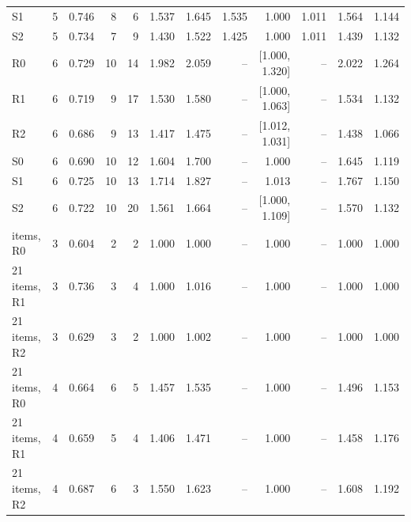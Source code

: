 \begin{table}[h]
\begin{tabular}{llrrrrrrrrrr}
S1 & 5 & 0.746 & 8 & 6 & 1.537 & 1.645 & 1.535 & 1.000 & 1.011 & 1.564 & 1.144 \\
S2 & 5 & 0.734 & 7 & 9 & 1.430 & 1.522 & 1.425 & 1.000 & 1.011 & 1.439 & 1.132 \\
R0 & 6 & 0.729 & 10 & 14 & 1.982 & 2.059 & -- & [1.000, 1.320] & -- & 2.022 & 1.264 \\
R1 & 6 & 0.719 & 9 & 17 & 1.530 & 1.580 & -- & [1.000, 1.063] & -- & 1.534 & 1.132 \\
R2 & 6 & 0.686 & 9 & 13 & 1.417 & 1.475 & -- & [1.012, 1.031] & -- & 1.438 & 1.066 \\
S0 & 6 & 0.690 & 10 & 12 & 1.604 & 1.700 & -- & 1.000 & -- & 1.645 & 1.119 \\
S1 & 6 & 0.725 & 10 & 13 & 1.714 & 1.827 & -- & 1.013 & -- & 1.767 & 1.150 \\
S2 & 6 & 0.722 & 10 & 20 & 1.561 & 1.664 & -- & [1.000, 1.109] & -- & 1.570 & 1.132 \\
\addlinespace[2pt]
21 items, R0 & 3 & 0.604 & 2 & 2 & 1.000 & 1.000 & -- & 1.000 & -- & 1.000 & 1.000 \\
21 items, R1 & 3 & 0.736 & 3 & 4 & 1.000 & 1.016 & -- & 1.000 & -- & 1.000 & 1.000 \\
21 items, R2 & 3 & 0.629 & 3 & 2 & 1.000 & 1.002 & -- & 1.000 & -- & 1.000 & 1.000 \\
21 items, R0 & 4 & 0.664 & 6 & 5 & 1.457 & 1.535 & -- & 1.000 & -- & 1.496 & 1.153 \\
21 items, R1 & 4 & 0.659 & 5 & 4 & 1.406 & 1.471 & -- & 1.000 & -- & 1.458 & 1.176 \\
21 items, R2 & 4 & 0.687 & 6 & 3 & 1.550 & 1.623 & -- & 1.000 & -- & 1.608 & 1.192 \\
\bottomrule
\end{tabular}
\end{table}

